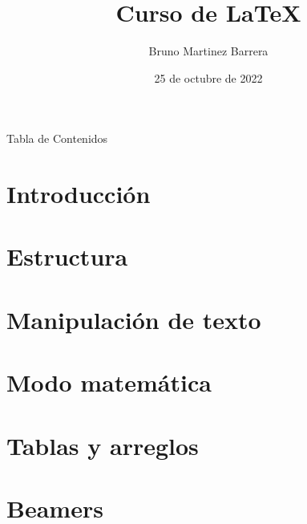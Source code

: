 \documentclass[10pt]{beamer}
\title{Curso de \LaTeX{}}
\author{Bruno Martinez Barrera}
\date{25 de octubre de 2022}
\begin{document}
    \begin{frame}
        \maketitle
    \end{frame}
    
    \begin{frame}{Tabla de Contenidos}
        \tableofcontents[hideallsubsections]
    \end{frame}
	
\section{Introducción}

    

\section{Estructura}

    
    
\section{Manipulación de texto}

    

\section{Modo matemática}

    
    
\section{Tablas y arreglos}

    
    
\section{Beamers}

    
\end{document}
